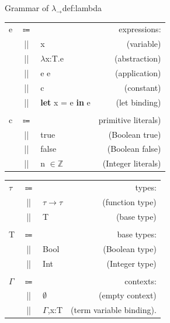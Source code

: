 \begin{definitiontitled}{Grammar of $\lambda_{\rightarrow}$}{def:lambda}
\begin{changemargin}{-0.5cm}{0cm}
\begin{minipage}[b]{0.50\linewidth}
\begin{tabular}{lclr}
e       & $\Coloneqq$ &                 & expressions: \\
        & ||    & x                     & (variable) \\
        & ||    & $\lambda$x:T.e         & (abstraction) \\
        & ||    & e e                   & (application) \\
        & ||    & c                     & (constant) \\
        & ||    & \textbf{let} x = e \textbf{in} e        & (let binding) \\
\\
c       & $\Coloneqq$ &                 & primitive literals) \\
        & ||    & true                  & (Boolean true) \\
        & ||    & false                 & (Boolean false) \\
        & ||    & n $\in \mathbb{Z}$    & (Integer literals) \\
\end{tabular}
\end{minipage}
\begin{minipage}[b]{0.40\linewidth}
\begin{tabular}{lclr}
$\tau$  & $\Coloneqq$ &                 & types: \\
        & ||     & $\tau \rightarrow \tau$    & (function type) \\
        & ||     & T                     & (base type) \\
\\
T       & $\Coloneqq$ &                 & base types: \\
        & ||     & Bool                  & (Boolean type) \\
        & ||     & Int                   & (Integer type) \\
\\
$\Gamma$& $\Coloneqq$ &                 & contexts: \\
        & ||     & $\emptyset$           & (empty context) \\
        & ||     & $\Gamma$,x:T          & (term variable binding). \\
\end{tabular}
\end{minipage}
\end{changemargin}
\end{definitiontitled}

